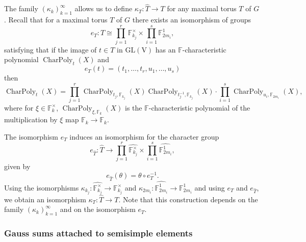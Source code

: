 \documentclass[12pt, reqno]{amsart}
\theoremstyle{definition}
\theoremstyle{definition}
\theoremstyle{definition}
\newcommand{\multiplicativegroup}[1]{#1^{\times}}
\newcommand{\hermitianSpace}{\mathrm{V}}
\newcommand{\GL}{\mathrm{GL}}
\newcommand{\finiteField}{\mathbb{F}}
\newcommand{\finiteFieldExtension}[1]{\finiteField_{#1}}
\newcommand{\charactergroup}[1]{\widehat{\multiplicativegroup{\finiteFieldExtension{#1}}}}
\newcommand{\ToriDualToriIsomorphism}{\kappa}
\newcommand{\characteristicPolynomial}{\operatorname{CharPoly}}
\begin{document}
The family $\left(\ToriDualToriIsomorphism_k\right)_{k=1}^{\infty}$ allows us to define $\ToriDualToriIsomorphism_T \colon \widehat{T} \to T$ for any maximal torus $T$ of $G$. Recall that for a maximal torus $T$ of $G$ there exists an isomorphism of groups $$e_T \colon T \cong \prod_{j=1}^r \multiplicativegroup{\finiteFieldExtension{k_j}} \times \prod_{i=1}^s \finiteFieldExtension{2m_i}^1,$$
satisfying that if the image of $t \in T$ in $\GL\left(\hermitianSpace\right)$ has an $\finiteField$-characteristic polynomial $\characteristicPolynomial_{t}\left(X\right)$ and $$e_T\left(t\right) = \left(t_1,\dots,t_r,u_1,\dots,u_s\right)$$ then $$\characteristicPolynomial_{t}\left(X\right) = \prod_{j=1}^r \characteristicPolynomial_{t_j, \finiteFieldExtension{k_j}}\left(X\right) \characteristicPolynomial_{t_j^{-1}, \finiteFieldExtension{k_j}}\left(X\right) \cdot \prod_{i=1}^s \characteristicPolynomial_{u_i, \finiteFieldExtension{2 m_i}}\left(X\right),$$
where for $\xi \in \multiplicativegroup{\finiteFieldExtension{k}}$, $\characteristicPolynomial_{\xi, \finiteFieldExtension{k}}\left(X\right)$ is the $\finiteField$-characteristic polynomial of the multiplication by $\xi$ map $\finiteFieldExtension{k} \to \finiteFieldExtension{k}$.

The isomorphism $e_T$ induces an isomorphism for the character group $$e_{\widehat{T}} \colon \widehat{T} \to \prod_{j=1}^r \charactergroup{k_j} \times \prod_{i=1}^s \widehat{\finiteFieldExtension{2m_i}^1},$$
given by
$$e_{\widehat{T}}\left(\theta\right) = \theta \circ e_T^{-1}.$$
Using the isomorphisms $\ToriDualToriIsomorphism_{k_j} \colon \charactergroup{k_j} \to \multiplicativegroup{\finiteFieldExtension{k_j}}$ and $\ToriDualToriIsomorphism_{2m_i} \colon \widehat{\finiteFieldExtension{2m_i}^1} \to \finiteFieldExtension{2m_i}^1$ and using $e_T$ and $e_{\widehat{T}}$, we obtain an isomorphism $\ToriDualToriIsomorphism_{T} \colon \widehat{T} \to T$. Note that this construction depends on the family $\left(\ToriDualToriIsomorphism_k\right)_{k=1}^{\infty}$ and on the isomorphism $e_T$.



\subsubsection{Gauss sums attached to semisimple elements}\label{subsec:gauss-sums-attached-to-semi-simple}
\end{document}
